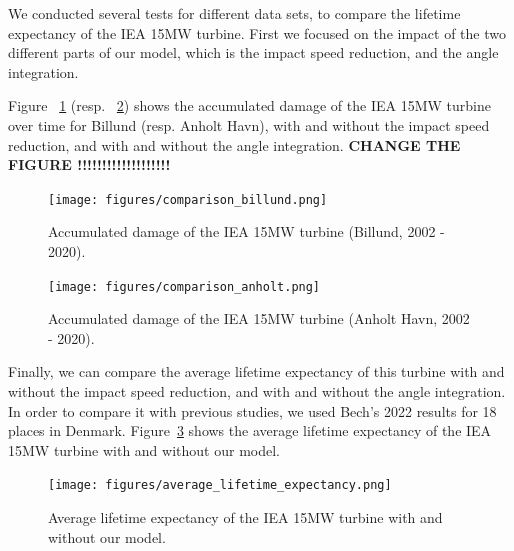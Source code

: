\documentclass[10pt]{report}
\begin{document}
\vspace{5mm}
\par We conducted several tests for different data sets, to compare the lifetime expectancy of the IEA 15MW turbine. First we focused on the impact of the two different parts of our model, which is the impact speed reduction, and the angle integration.
\par Figure ~\ref{fig:accumulated_damage_billund} (resp. ~\ref{fig:accumulated_damage_anholt}) shows the accumulated damage of the IEA 15MW turbine over time for Billund (resp. Anholt Havn), with and without the impact speed reduction, and with and without the angle integration. 
\textbf{CHANGE THE FIGURE !!!!!!!!!!!!!!!!!!!}
\begin{figure}[H]
    \centering
    \texttt{[image: figures/comparison\_billund.png]}
    \caption{Accumulated damage of the IEA 15MW turbine (Billund, 2002 - 2020).}
    \label{fig:accumulated_damage_billund}
\end{figure}

\begin{figure}[H]
    \centering
    \texttt{[image: figures/comparison\_anholt.png]}
    \caption{Accumulated damage of the IEA 15MW turbine (Anholt Havn, 2002 - 2020).}
    \label{fig:accumulated_damage_anholt}
\end{figure}

Finally, we can compare the average lifetime expectancy of this turbine with and without the impact speed reduction, and with and without the angle integration. In order to compare it with previous studies, we used Bech's 2022 results \cite{Bech2022} for 18 places in Denmark. Figure~\ref{fig:average_lifetime_expectancy} shows the average lifetime expectancy of the IEA 15MW turbine with and without our model.
\begin{figure}[H]
    \centering
    \texttt{[image: figures/average\_lifetime\_expectancy.png]}
    \caption{Average lifetime expectancy of the IEA 15MW turbine with and without our model.}
    \label{fig:average_lifetime_expectancy}
\end{figure}


\end{document}

